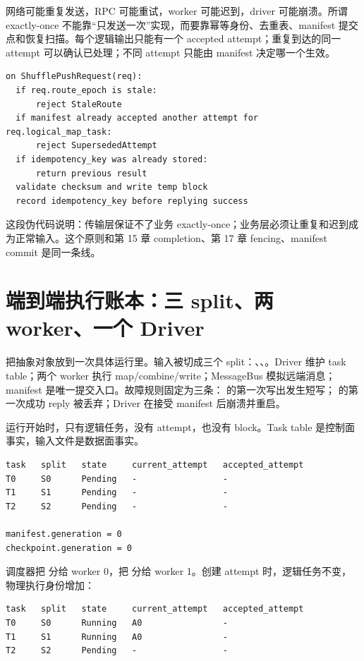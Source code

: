 网络可能重复发送，RPC 可能重试，worker 可能迟到，driver 可能崩溃。所谓 exactly-once 不能靠“只发送一次”实现，而要靠幂等身份、去重表、manifest 提交点和恢复扫描。每个逻辑输出只能有一个 accepted attempt；重复到达的同一 attempt 可以确认已处理；不同 attempt 只能由 manifest 决定哪一个生效。

\begin{lstlisting}[numbers=none,caption={服务端处理重复 shuffle push 的判定顺序}]
on ShufflePushRequest(req):
  if req.route_epoch is stale:
      reject StaleRoute
  if manifest already accepted another attempt for req.logical_map_task:
      reject SupersededAttempt
  if idempotency_key was already stored:
      return previous result
  validate checksum and write temp block
  record idempotency_key before replying success
\end{lstlisting}

这段伪代码说明：传输层保证不了业务 exactly-once；业务层必须让重复和迟到成为正常输入。这个原则和第 15 章 completion、第 17 章 fencing、manifest commit 是同一条线。

\section{端到端执行账本：三 split、两 worker、一个 Driver}

把抽象对象放到一次具体运行里。输入被切成三个 split：、、。Driver 维护 task table；两个 worker 执行 map/combine/write；MessageBus 模拟远端消息；manifest 是唯一提交入口。故障规则固定为三条： 的第一次写出发生短写； 的第一次成功 reply 被丢弃；Driver 在接受  manifest 后崩溃并重启。

运行开始时，只有逻辑任务，没有 attempt，也没有 block。Task table 是控制面事实，输入文件是数据面事实。

\begin{lstlisting}[numbers=none,caption={初始 task table}]
task   split   state     current_attempt   accepted_attempt
T0     S0      Pending   -                 -
T1     S1      Pending   -                 -
T2     S2      Pending   -                 -

manifest.generation = 0
checkpoint.generation = 0
\end{lstlisting}

调度器把  分给 worker 0，把  分给 worker 1。创建 attempt 时，逻辑任务不变，物理执行身份增加：

\begin{lstlisting}[numbers=none,caption={创建 attempt 后的 task table}]
task   split   state     current_attempt   accepted_attempt
T0     S0      Running   A0                -
T1     S1      Running   A0                -
T2     S2      Pending   -                 -
\end{lstlisting}

